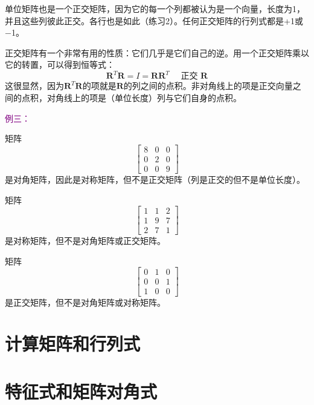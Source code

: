 \documentclass[lang=cn,12pt,marginpar=margintrue]{elegantbook}
\begin{document}
单位矩阵也是一个正交矩阵，因为它的每一个列都被认为是一个向量，长度为1，并且这些列彼此正交。各行也是如此（练习2）。任何正交矩阵的行列式都是+1或−1。

正交矩阵有一个非常有用的性质：它们几乎是它们自己的逆。用一个正交矩阵乘以它的转置，可以得到恒等式：
\[
\mathbf{R}^T \mathbf{R}=I=\mathbf{R} \mathbf{R}^T \quad \text { 正交 } \mathbf{R}
\]
这很显然，因为$\mathbf{R}^T \mathbf{R}$的项就是$\mathbf{R}$的列之间的点积。非对角线上的项是正交向量之间的点积，对角线上的项是（单位长度）列与它们自身的点积。

\textcolor{purple}{例三：}

矩阵
\[
  \left[\begin{array}{lll}
      8 & 0 & 0 \\
      0 & 2 & 0 \\
      0 & 0 & 9
    \end{array}\right]
\]
是对角矩阵，因此是对称矩阵，但不是正交矩阵（列是正交的但不是单位长度）。

矩阵
\[
  \left[\begin{array}{lll}
      1 & 1 & 2 \\
      1 & 9 & 7 \\
      2 & 7 & 1
    \end{array}\right]
\]是对称矩阵，但不是对角矩阵或正交矩阵。

矩阵
\[
  \left[\begin{array}{lll}
      0 & 1 & 0 \\
      0 & 0 & 1 \\
      1 & 0 & 0
    \end{array}\right]
\]
是正交矩阵，但不是对角矩阵或对称矩阵。

\section{计算矩阵和行列式}
\section{特征式和矩阵对角式}
\end{document}
